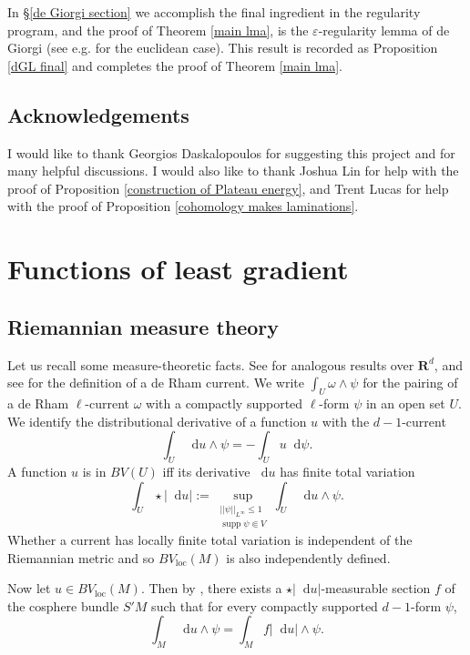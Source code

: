 \documentclass[reqno,12pt,letterpaper]{amsart}
\newcommand{\RR}{\mathbf{R}}
\DeclareMathOperator{\supp}{supp}
\newcommand*\dif{\mathop{}\!\mathrm{d}}
\newcommand{\loc}{\mathrm{loc}}
\theoremstyle{definition}
\numberwithin{equation}{section}
\begin{document}
In \S\ref{de Giorgi section} we accomplish the final ingredient in the regularity program, and the proof of Theorem \ref{main lma}, is the $\varepsilon$-regularity lemma of de Giorgi (see e.g. \cite[Teorema 5.7]{Miranda66} for the euclidean case).
This result is recorded as Proposition \ref{dGL final} and completes the proof of Theorem \ref{main lma}.


\subsection{Acknowledgements}
I would like to thank Georgios Daskalopoulos for suggesting this project and for many helpful discussions.
I would also like to thank Joshua Lin for help with the proof of Proposition \ref{construction of Plateau energy}, and Trent Lucas for help with the proof of Proposition \ref{cohomology makes laminations}.


\section{Functions of least gradient}\label{LeastGradientFunctions}
\subsection{Riemannian measure theory}
Let us recall some measure-theoretic facts.
See \cite[Chapter 1]{Giusti77} for analogous results over $\RR^d$, and see \cite{simon1983GMT} for the definition of a de Rham current.
We write $\int_U \omega \wedge \psi$ for the pairing of a de Rham $\ell$-current $\omega$ with a compactly supported $\ell$-form $\psi$ in an open set $U$.
We identify the distributional derivative of a function $u$ with the $d-1$-current
$$\int_U \dif u \wedge \psi = -\int_U u \dif \psi.$$
A function $u$ is in $BV(U)$ iff its derivative $\dif u$ has finite total variation
\begin{equation}\label{total variation}
\int_U \star |\dif u| := \sup_{\substack{||\psi||_{L^\infty} \leq 1\\\supp \psi \Subset V}} \int_U \dif u \wedge \psi.
\end{equation}
Whether a current has locally finite total variation is independent of the Riemannian metric and so $BV_\loc(M)$ is also independently defined.

Now let $u \in BV_\loc(M)$.
Then by \cite[Theorem 4.14]{simon1983GMT}, there exists a $\star |\dif u|$-measurable section $f$ of the cosphere bundle $S'M$ such that for every compactly supported $d-1$-form $\psi$,
\begin{equation}\label{RNy formula}
\int_M \dif u \wedge \psi = \int_M f|\dif u| \wedge \psi.
\end{equation}
\end{document}
